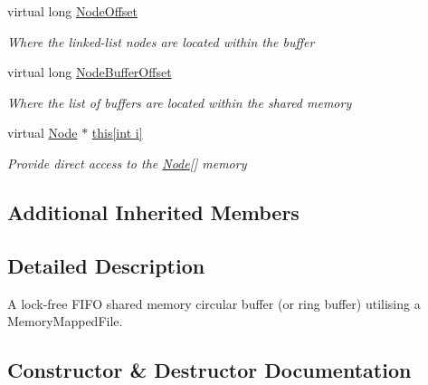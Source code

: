 \begin{DoxyCompactItemize}
virtual long \hyperlink{class_shared_memory_1_1_circular_buffer_a551af249ceca9d75331cf72de943a21d}{Node\+Offset}
\begin{DoxyCompactList}\small\item\em Where the linked-\/list nodes are located within the buffer \end{DoxyCompactList}\item 
virtual long \hyperlink{class_shared_memory_1_1_circular_buffer_a4ec1c53a1ba26daf9d6df25fad2f6621}{Node\+Buffer\+Offset}
\begin{DoxyCompactList}\small\item\em Where the list of buffers are located within the shared memory \end{DoxyCompactList}\item 
virtual \hyperlink{struct_shared_memory_1_1_circular_buffer_1_1_node}{Node} $\ast$ \hyperlink{class_shared_memory_1_1_circular_buffer_ab594664b851446512ae4ca11a6d44274}{this\mbox{[}int i\mbox{]}}
\begin{DoxyCompactList}\small\item\em Provide direct access to the \hyperlink{struct_shared_memory_1_1_circular_buffer_1_1_node}{Node}\mbox{[}\mbox{]} memory \end{DoxyCompactList}\end{DoxyCompactItemize}
\subsection*{Additional Inherited Members}


\subsection{Detailed Description}
A lock-\/free F\+I\+FO shared memory circular buffer (or ring buffer) utilising a Memory\+Mapped\+File. 



\subsection{Constructor \& Destructor Documentation}
\mbox{\label{class_shared_memory_1_1_circular_buffer_a50ab9ecafab3807e22fbadd32234830a}} 
